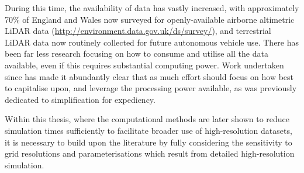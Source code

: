 During this time, the availability of data has vastly increased, with approximately 70\% of England and Wales now surveyed for openly-available airborne altimetric LiDAR data (\url{http://environment.data.gov.uk/ds/survey/}), and terrestrial LiDAR data now routinely collected for future autonomous vehicle use. There has been far less research focusing on how to consume and utilise all the data available, even if this requires substantial computing power. Work undertaken since \citet{Brodtkorb2010} has made it abundantly clear that as much effort should focus on how best to capitalise upon, and leverage the processing power available, as was previously dedicated to simplification for expediency.

Within this thesis, where the computational methods are later shown to reduce simulation times sufficiently to facilitate broader use of high-resolution datasets, it is necessary to build upon the literature by fully considering the sensitivity to grid resolutions and parameterisations which result from detailed high-resolution simulation.
